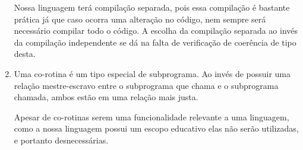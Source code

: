 \documentclass[12pt, a4paper]{article}
\begin{document}
\begin{enumerate}
        Nossa linguagem terá compilação separada, pois essa compilação é
        bastante prática já que caso ocorra uma alteração no código, nem sempre
        será necessário compilar todo o código. A escolha da compilação
        separada ao invés da compilação independente se dá na falta de
        verificação de coerência de tipo desta.

        \item
        Uma co-rotina é um tipo especial de subprograma. Ao invés de possuir
        uma relação mestre-escravo entre o subprograma que chama e o
        subprograma chamada, ambos estão em uma relação mais justa.

        Apesar de co-rotinas serem uma funcionalidade relevante a uma
        linguagem, como a nossa linguagem possui um escopo educativo elas não
        serão utilizadas, e portanto desnecessárias.

    \end{enumerate}
\end{document}
